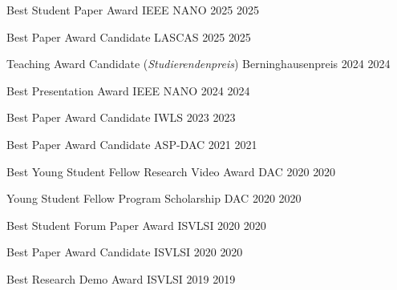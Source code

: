 

\begin{cvhonors}

  \cvhonor
    {Best Student Paper Award} %
    {IEEE NANO 2025} %
    {} %
    {2025} %

  \cvhonor
    {Best Paper Award Candidate} %
    {LASCAS 2025} %
    {} %
    {2025} %

  \cvhonor
    {Teaching Award Candidate (\emph{Studierendenpreis})} %
    {Berninghausenpreis 2024} %
    {} %
    {2024} %

  \cvhonor
    {Best Presentation Award} %
    {IEEE NANO 2024} %
    {} %
    {2024} %

  \cvhonor
    {Best Paper Award Candidate} %
    {IWLS 2023} %
    {} %
    {2023} %

  \cvhonor
    {Best Paper Award Candidate} %
    {ASP-DAC 2021} %
    {} %
    {2021} %

  \cvhonor
    {Best Young Student Fellow Research Video Award} %
    {DAC 2020} %
    {} %
    {2020} %

  \cvhonor
    {Young Student Fellow Program Scholarship} %
    {DAC 2020} %
    {} %
    {2020} %

  \cvhonor
    {Best Student Forum Paper Award} %
    {ISVLSI 2020} %
    {} %
    {2020} %

  \cvhonor
    {Best Paper Award Candidate} %
    {ISVLSI 2020} %
    {} %
    {2020} %

  \cvhonor
    {Best Research Demo Award} %
    {ISVLSI 2019} %
    {} %
    {2019} %

\end{cvhonors}
